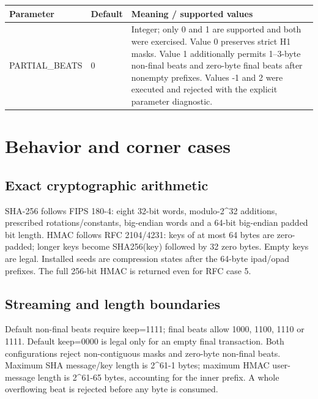 \documentclass[11pt,a4paper]{article}
\begin{document}
{\small\renewcommand{\arraystretch}{1.18}\begin{longtable}{@{}L{0.22\textwidth}|L{0.21\textwidth}|L{0.49\textwidth}@{}}\toprule

\textbf{Parameter} & \textbf{Default} & \textbf{Meaning /\allowbreak{} supported values}\\\midrule\endhead

PARTIAL\_\allowbreak{}BEATS & 0 & Integer; only 0 and 1 are supported and both were exercised. Value 0 preserves strict H1 masks. Value 1 additionally permits 1–3-byte non-final beats and zero-byte final beats after nonempty prefixes. Values -1 and 2 were executed and rejected with the explicit parameter diagnostic.\\[2pt]\hline

\bottomrule\end{longtable}}

\section{Behavior and corner cases}

\subsection{Exact cryptographic arithmetic}

SHA-256 follows FIPS 180-4: eight 32-bit words,\allowbreak{} modulo-2\textasciicircum{}32 additions,\allowbreak{} prescribed rotations/\allowbreak{}constants,\allowbreak{} big-endian words and a 64-bit big-endian padded bit length. HMAC follows RFC 2104/\allowbreak{}4231: keys of at most 64 bytes are zero-padded; longer keys become SHA256(\allowbreak{}key)\allowbreak{} followed by 32 zero bytes. Empty keys are legal. Installed seeds are compression states after the 64-byte ipad/\allowbreak{}opad prefixes. The full 256-bit HMAC is returned even for RFC case 5.

\subsection{Streaming and length boundaries}

Default non-final beats require keep=\allowbreak{}1111; final beats allow 1000,\allowbreak{} 1100,\allowbreak{} 1110 or 1111. Default keep=\allowbreak{}0000 is legal only for an empty final transaction. Both configurations reject non-contiguous masks and zero-byte non-final beats. Maximum SHA message/\allowbreak{}key length is 2\textasciicircum{}61-1 bytes; maximum HMAC user-message length is 2\textasciicircum{}61-65 bytes,\allowbreak{} accounting for the inner prefix. A whole overflowing beat is rejected before any byte is consumed.
\end{document}
